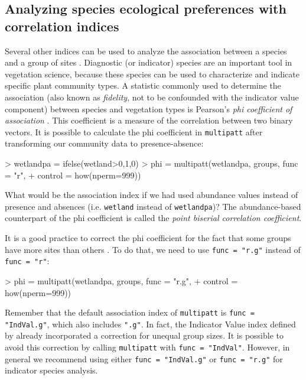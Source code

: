 \documentclass[11pt,a4paper]{article}
\begin{document}
\subsection{Analyzing species ecological preferences with correlation indices}
Several other indices can be used to analyze the association between a species and a group of sites \citep{DeCaceres2009}. Diagnostic (or indicator) species are an important tool in vegetation science, because these species can be used to characterize and indicate specific plant community types. A statistic commonly used to determine the association (also known as \emph{fidelity}, not to be confounded with the indicator value component) between species and vegetation types is Pearson's \emph{phi coefficient of association} \citep{Chytry2002a}. This coefficient is a measure of the correlation between two binary vectors. It is possible to calculate the phi coefficient in \texttt{multipatt} after transforming our community data to presence-absence:
\begin{Schunk}
\begin{Sinput}
> wetlandpa = ifelse(wetland>0,1,0)
> phi = multipatt(wetlandpa, groups, func = "r", 
+                 control = how(nperm=999)) 
\end{Sinput}
\end{Schunk}
What would be the association index if we had used abundance values instead of presence and absences (i.e. \texttt{wetland} instead of \texttt{wetlandpa})? The abundance-based counterpart of the phi coefficient is called the \emph{point biserial correlation coefficient}.

It is a good practice to correct the phi coefficient for the fact that some groups have more sites than others \citep{Tichy2006}. To do that, we need to use \texttt{func = "r.g"} instead of \texttt{func = "r"}: 
\begin{Schunk}
\begin{Sinput}
> phi = multipatt(wetlandpa, groups, func = "r.g", 
+                 control = how(nperm=999)) 
\end{Sinput}
\end{Schunk}

Remember that the default association index of \texttt{multipatt} is \texttt{func = "IndVal.g"}, which also includes \texttt{".g"}. In fact, the Indicator Value index defined by \citet{Dufrene1997} already incorporated a correction for unequal group sizes. It is possible to avoid this correction by calling \texttt{multipatt} with \texttt{func = "IndVal"}. However, in general we recommend using either \texttt{func = "IndVal.g"} or \texttt{func = "r.g"} for indicator species analysis.
\end{document}
